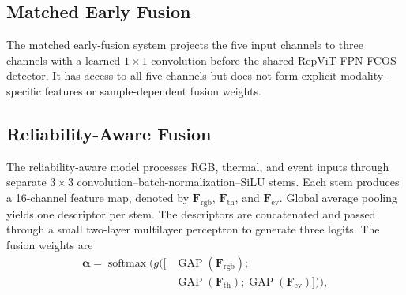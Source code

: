 \documentclass[pdflatex,sn-basic,Numbered,iicol]{sn-jnl}
\begin{document}
\subsection{Matched Early Fusion}
The matched early-fusion system projects the five input channels to three channels with a learned $1\times1$ convolution before the shared RepViT-FPN-FCOS detector. It has access to all five channels but does not form explicit modality-specific features or sample-dependent fusion weights.

\subsection{Reliability-Aware Fusion}
The reliability-aware model processes RGB, thermal, and event inputs through separate $3\times3$ convolution--batch-normalization--SiLU stems. Each stem produces a 16-channel feature map, denoted by $\mathbf{F}_{\mathrm{rgb}}$, $\mathbf{F}_{\mathrm{th}}$, and $\mathbf{F}_{\mathrm{ev}}$. Global average pooling yields one descriptor per stem. The descriptors are concatenated and passed through a small two-layer multilayer perceptron to generate three logits. The fusion weights are
\begin{equation}
\begin{aligned}
\boldsymbol{\alpha}=\operatorname{softmax}\bigl(g([&\operatorname{GAP}(\mathbf{F}_{\mathrm{rgb}});\\
&\operatorname{GAP}(\mathbf{F}_{\mathrm{th}});\operatorname{GAP}(\mathbf{F}_{\mathrm{ev}})])\bigr),
\end{aligned}
\end{equation}
\end{document}
